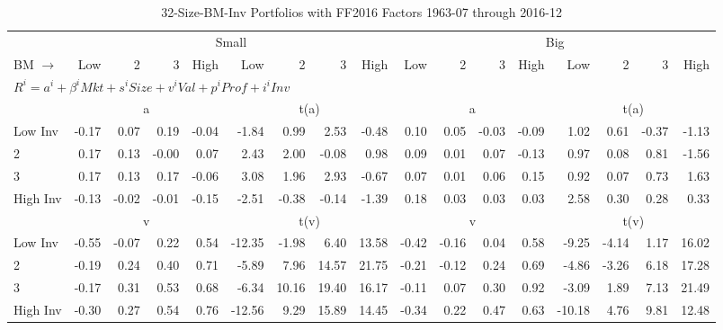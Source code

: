 
\begin{table}[!ht]
\centering
\caption{32-Size-BM-Inv Portfolios with FF2016 Factors 1963-07 through 2016-12}
\begin{tabular}{lrrrrrrrrrrrrrrrr}
  \toprule
    & \multicolumn{8}{c}{Small} & \multicolumn{8}{c}{Big} \\
      \cmidrule(r){2-9} \cmidrule(r){10-17}
    BM $\rightarrow$ & Low & 2 & 3 & High & Low & 2 & 3 & High & Low & 2 & 3 & High & Low & 2 & 3 & High \\ 
  \midrule
  \multicolumn{17}{l}{$R^i=a^i+\beta^iMkt+s^iSize+v^iVal+p^iProf+i^iInv$} \\

  
    
      & \multicolumn{4}{c}{a} & \multicolumn{4}{c}{t(a)}
    
      & \multicolumn{4}{c}{a} & \multicolumn{4}{c}{t(a)}
    
    \\
      \cmidrule(r){2-5} \cmidrule(r){6-9} \cmidrule(r){10-13} \cmidrule(r){14-17}

    Low Inv   & -0.17  & 0.07  & 0.19  & -0.04  & -1.84  & 0.99  & 2.53  & -0.48  & 0.10  & 0.05  & -0.03  & -0.09  & 1.02  & 0.61  & -0.37  & -1.13  \\
           2  & 0.17  & 0.13  & -0.00  & 0.07  & 2.43  & 2.00  & -0.08  & 0.98  & 0.09  & 0.01  & 0.07  & -0.13  & 0.97  & 0.08  & 0.81  & -1.56  \\
           3  & 0.17  & 0.13  & 0.17  & -0.06  & 3.08  & 1.96  & 2.93  & -0.67  & 0.07  & 0.01  & 0.06  & 0.15  & 0.92  & 0.07  & 0.73  & 1.63  \\
    High Inv  & -0.13  & -0.02  & -0.01  & -0.15  & -2.51  & -0.38  & -0.14  & -1.39  & 0.18  & 0.03  & 0.03  & 0.03  & 2.58  & 0.30  & 0.28  & 0.33  \\

  
    
      & \multicolumn{4}{c}{v} & \multicolumn{4}{c}{t(v)}
    
      & \multicolumn{4}{c}{v} & \multicolumn{4}{c}{t(v)}
    
    \\
      \cmidrule(r){2-5} \cmidrule(r){6-9} \cmidrule(r){10-13} \cmidrule(r){14-17}

    Low Inv   & -0.55  & -0.07  & 0.22  & 0.54  & -12.35  & -1.98  & 6.40  & 13.58  & -0.42  & -0.16  & 0.04  & 0.58  & -9.25  & -4.14  & 1.17  & 16.02  \\
           2  & -0.19  & 0.24  & 0.40  & 0.71  & -5.89  & 7.96  & 14.57  & 21.75  & -0.21  & -0.12  & 0.24  & 0.69  & -4.86  & -3.26  & 6.18  & 17.28  \\
           3  & -0.17  & 0.31  & 0.53  & 0.68  & -6.34  & 10.16  & 19.40  & 16.17  & -0.11  & 0.07  & 0.30  & 0.92  & -3.09  & 1.89  & 7.13  & 21.49  \\
    High Inv  & -0.30  & 0.27  & 0.54  & 0.76  & -12.56  & 9.29  & 15.89  & 14.45  & -0.34  & 0.22  & 0.47  & 0.63  & -10.18  & 4.76  & 9.81  & 12.48  \\


\end{tabular}
\end{table}
